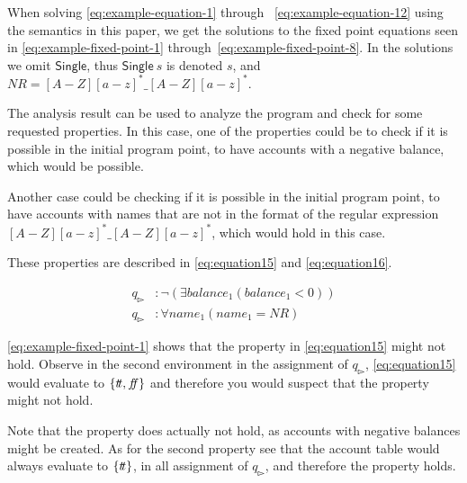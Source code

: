 When solving \autoref{eq:example-equation-1} through ~\autoref{eq:example-equation-12} using the semantics in this paper, we get the solutions to the fixed point equations seen in \autoref{eq:example-fixed-point-1} through~\ref{eq:example-fixed-point-8}.
In the solutions we omit $\mathsf{Single}$, thus $\mathsf{Single} \ s$ is denoted $s$, and $NR =  [A-Z][a-z]^*\_[A-Z][a-z]^*$.



The analysis result can be used to analyze the program and check for some requested properties.
In this case, one of the properties could be to check if it is possible in the initial program point, to have accounts with a negative balance, which would be possible.

Another case could be checking if it is possible in the initial program point, to have accounts with names that are not in the format of the regular expression $[A-Z][a-z]^*\_ [A-Z][a-z]^*$, which would hold in this case.

These properties are described in \autoref{eq:equation15} and \autoref{eq:equation16}.

\begin{align}
     q_{\whitepointerright}&:\neg(\exists balance_1(balance_1<0))\label{eq:equation15}  \\
     q_{\whitepointerright}&:\forall name_1(name_1 = NR) \label{eq:equation16}
\end{align}

\autoref{eq:example-fixed-point-1} shows that the property in \autoref{eq:equation15} might not hold.
Observe in the second environment in the assignment of $q_{\whitepointerright}$, \autoref{eq:equation15} would evaluate to $\{t\!t, f\!\!f\}$ and therefore you would suspect that the property might not hold.

Note that the property does actually not hold, as accounts with negative balances might be created.
As for the second property see that the account table would always evaluate to $\{t\!t\}$, in all assignment of $q_{\whitepointerright}$, and therefore the property holds.
